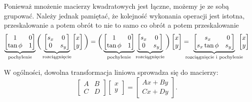 \documentclass[10pt,twocolumn,fleqn,polish]{article}
\begin{document}
Ponieważ mnożenie macierzy kwadratowych jest łączne, możemy je ze sobą grupować.
Należy jednak pamiętać, że kolejność wykonania operacji jest istotna,
przeskalowanie a potem obrót to nie to samo co obrót a potem przeskalowanie
\[
  \underbrace{
    \begin{bmatrix}
      1 & 0 \\ \tan\phi & 1
    \end{bmatrix}
  }_\text{pochylenie}
  \bigg(
  \underbrace{
    \begin{bmatrix}
      s_x & 0 \\ 0 & s_y
    \end{bmatrix}
  }_\text{rozciągnięcie}
  \begin{bmatrix}
    x \\ y
  \end{bmatrix}
  \bigg) =
  \bigg(
  \underbrace{
    \begin{bmatrix}
      1 & 0 \\ \tan\phi & 1
    \end{bmatrix}
  }_\text{pochylenie}
  \underbrace{
    \begin{bmatrix}
      s_x & 0 \\ 0 & s_y
    \end{bmatrix}
  }_\text{rozciągnięcie}
  \bigg)
  \begin{bmatrix}
    x \\ y
  \end{bmatrix} =
  \mkern-15mu
  \underbrace{
    \begin{bmatrix}
      s_x & 0 \\ s_x \tan\phi & s_y
    \end{bmatrix}
  }_\text{rozciągnięcie i pochylenie}
  \mkern-15mu
  \begin{bmatrix}
    x \\ y
  \end{bmatrix}
\]

W ogólności, dowolna transformacja liniowa sprowadza się do macierzy:
\[
  \begin{bmatrix}
    A & B \\
    C & D
  \end{bmatrix}
  \begin{bmatrix}
    x \\ y
  \end{bmatrix} =
  \begin{bmatrix}
    Ax + By \\
    Cx + Dy
  \end{bmatrix}.
\]
\end{document}
